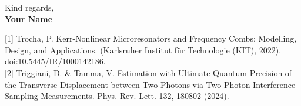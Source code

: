 \documentclass[11pt]{report}
\begin{document}
\begin{titlepage}
\lipsum[1]

\vspace{0.7em}


\lipsum[1]

\vspace{0.7em}


\lipsum[1]

\vspace{0.7em}


\lipsum[1]

\vspace{0.7em}



\begin{minipage}[t]{0.17\textwidth}
    \raggedright Kind regards,\\
    \textbf{Your Name}
\end{minipage}
\hfill
\begin{minipage}[t]{0.8\textwidth}
    \tiny{[1] Trocha, P. Kerr-Nonlinear Microresonators and Frequency Combs: Modelling, Design, and Applications. (Karlsruher Institut für Technologie (KIT), 2022). doi:10.5445/IR/1000142186.}\\
    \tiny{[2] Triggiani, D. \& Tamma, V. Estimation with Ultimate Quantum Precision of the Transverse Displacement between Two Photons via Two-Photon Interference Sampling Measurements. Phys. Rev. Lett. 132, 180802 (2024).}
\end{minipage}



\end{titlepage}
\end{document}
